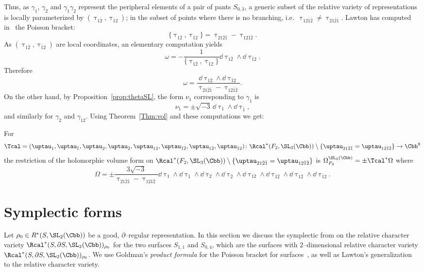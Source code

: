 Thus, as $\gamma_1$, $\gamma_2$ and $\gamma_{1}\gamma_2$ represent the peripheral elements of a pair of pants $S_{0,3}$, a generic subset of the relative variety of representations is locally parameterized by $(\uptau_{1\bar 2}, \uptau_{\bar 1 2})$; in the subset of points where there is no branching, i.e.~$\uptau_ {12\bar1\bar2} \neq \uptau_{21\bar 2\bar 1}$. Lawton has computed in~\cite[Theorem.~25]{LawtonP} the Poisson bracket:
\[
\{\uptau_{1\bar 2}, \uptau_{\bar 1 2} \}= \uptau_{21\bar 2\bar 1}-\uptau_{12\bar1\bar2}.
\]
As $(\uptau_{1\bar 2}, \uptau_{\bar 1 2})$ are local coordinates, an elementary computation yields
\begin{equation}\label{eqn:poisson}
\omega=-\frac{1}{ \{\uptau_{1\bar 2}, \uptau_{\bar 1 2} \} } \dd \uptau_{1\bar 2}\wedge \dd \uptau_{\bar 1 2}.
\end{equation}
Therefore
\begin{equation}\label{eqn:symplecticSL3}
\omega= \frac{\dd \uptau_{1\bar 2}\wedge \dd \uptau_{\bar 1 2} }{ \uptau_{21\bar2\bar1}-\uptau_{12\bar1\bar2}}.
\end{equation}
On the other hand, by Proposition~\ref{prop:thetaSL}, the form $\nu_1$ corresponding to $\gamma_1$ is
\[
\nu_1=\pm\sqrt{-3} \, \dd \uptau_1\wedge \dd \uptau_{\bar 1},
\]
and similarly for $\gamma_2$ and $\gamma_{12}$. Using Theorem~\ref{Thm:vol} and these computations we get:

\begin{prop}\label{Prop:volF2SL3}
For
\[
\Tcal=(\uptau_1,\uptau_{\bar 1},\uptau_2,\uptau_{\bar 2},\uptau_{12},\uptau_{\bar 1\bar 2},\uptau_{1\bar 2}, \uptau_{\bar 12})
\colon \Rcal^*(F_2,\SL_3(\Cbb))\setminus
\{ \uptau_{21\bar2\bar1} = \uptau_{12\bar1\bar2}\}\to \Cbb^8
\]
the restriction of the holomorphic volume form on $\Rcal^*(F_2,\SL_3(\Cbb))\setminus
\{ \uptau_{21\bar2\bar1} = \uptau_{12\bar1\bar2}\}$ is $ \Omega_{F_2}^{\SL_3(\Cbb) }= \pm \Tcal^*\Omega$ where
\[
\Omega=\pm \frac{3\sqrt{-3}}{ \uptau_{21\bar2\bar1}-\uptau_{12\bar1\bar2}} \dd \uptau_1\wedge \dd \uptau_{\bar 1} \wedge \dd \uptau_2\wedge \dd \uptau_{\bar 2}
\wedge \dd \uptau_{12}\wedge \dd \uptau_{\bar 1\bar 2}\wedge \dd \uptau_{1\bar 2}\wedge \dd \uptau_{\bar 1 2}.
\]
\end{prop}


\section{Symplectic forms}\label{Section:symplectic}

Let $\rho_0 \in R^*(S, \SL_2(\Cbb))$ be a good, $\partial$--regular representation. In this section we discuss the symplectic from on the relative character variety $\Rcal^*(S,\partial S, \SL_2(\Cbb))_{\rho_0}$ for the two surfaces $S_{1,1}$ and $S_{0,4}$, which are the surfaces with 2--dimensional relative character variety $\Rcal^*(S,\partial S, \SL_2(\Cbb))_{\rho_0}$. We use Goldman's \emph{product formula} for the Poisson bracket for surfaces~\cite{GoldmanHamiltonian}, as well as Lawton's generalization~\cite[Section~4]{LawtonP} to the relative character variety.

